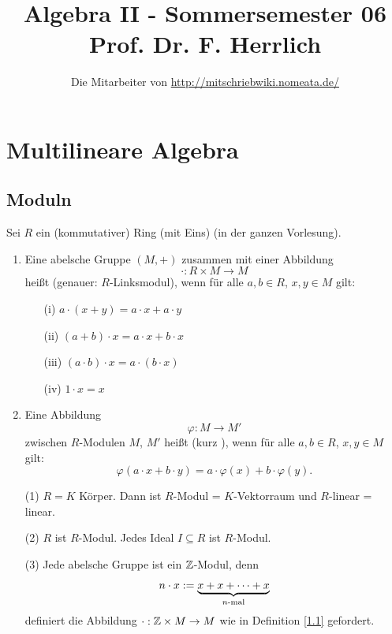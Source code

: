 \documentclass[a4paper, 10pt]{report}
\title{Algebra II - Sommersemester 06\\ Prof. Dr. F. Herrlich}
\author{Die Mitarbeiter von \url{http://mitschriebwiki.nomeata.de/}}
\begin{document}
\maketitle

\tableofcontents

\chapter{Multilineare Algebra}

\section{Moduln}

Sei $R$ ein (kommutativer) Ring (mit Eins) (in der ganzen Vorlesung).

\begin{Def}
\label{1.1}
\begin{enumerate}
\item Eine abelsche Gruppe $(M,+)$ zusammen mit einer Abbildung
\[
\cdot : R \times M \to M
\]
heißt \emp{\RMod} (genauer:
$R$-Linksmodul), wenn für alle $a,b\in R$, $x,y\in M$ gilt:
\begin{enumerate}
\item[(i)] $a \cdot (x+y) = a \cdot x + a \cdot y$
\item[(ii)] $(a+b) \cdot x = a \cdot x + b \cdot x$
\item[(iii)] $(a \cdot b) \cdot x = a \cdot (b \cdot x)$
\item[(iv)] $1 \cdot x = x$
\end{enumerate}
\item Eine Abbildung 
\[
\varphi: M \to M'
\]
zwischen $R$-Modulen $M$, $M'$
heißt \emp{\RModHom} (kurz
), wenn für alle $a,b \in R$, $x,y \in M$
gilt:
\[
\varphi (a \cdot x + b \cdot y) = a \cdot \varphi (x) + b \cdot \varphi (y).
\]
\end{enumerate}
\end{Def}

\begin{nnBsp}
\begin{enumerate}
\item[(1)] $R = K$ Körper. Dann ist $R$-Modul = $K$-Vektorraum und $R$-linear =
linear.
\item[(2)] $R$ ist $R$-Modul. Jedes Ideal $I \subseteq R$ ist $R$-Modul.
\item[(3)] Jede abelsche Gruppe ist ein $\mathbb{Z}$-Modul, denn
\[
n \cdot x := \underbrace{x + x + \cdots + x}_{n\text{-mal}}
\]
definiert die Abbildung $\cdot: \mathbb{Z} \times M \to M$ wie in Definition \ref{1.1}
gefordert.
\end{enumerate}
\end{nnBsp}
\end{document}

